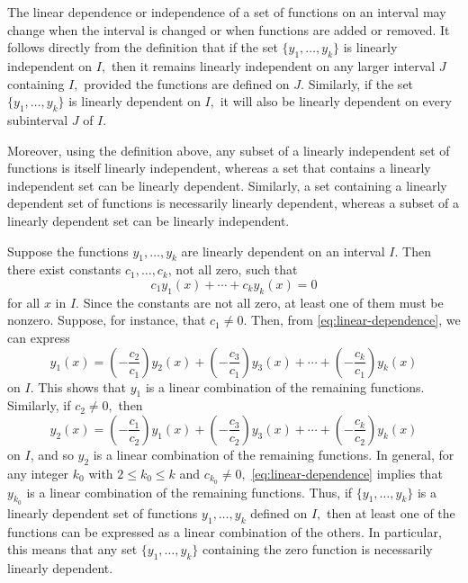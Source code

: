 The  linear dependence or independence of a set of functions on an interval may change when the interval is changed or when functions are added or removed. It follows directly from the definition that if the set \(\{y_1, \dots, y_k\}\) is linearly independent on \(I,\) then it remains linearly independent on any larger interval \(J\) containing \(I,\) provided the functions are defined on \(J.\) Similarly, if the set \(\{y_1, \dots, y_k\}\) is linearly dependent on \(I,\) it will also be linearly dependent on every subinterval \(J\) of \(I.\) 

 Moreover, using the definition above, any subset of a linearly independent set of functions is itself linearly independent, whereas  a set that contains a linearly independent set can  be linearly dependent. Similarly, a set containing a linearly dependent set of functions is necessarily linearly dependent, whereas a subset of a linearly dependent set can be linearly independent.






Suppose the functions \(y_1, \dots, y_k\) are linearly dependent on an interval \(I\). Then there exist constants \(c_1, \dots, c_k\), not all zero, such that  
\begin{equation}\label{eq:linear-dependence}
	c_1 y_1(x) + \cdots + c_k y_k(x) = 0
\end{equation}
for all \(x\) in \(I.\)
Since the constants are not all zero, at least one of them must be nonzero. Suppose, for instance, that \(c_1\ne 0.\)
Then, from \eqref{eq:linear-dependence}, we can express 
\[
y_1(x) = \left(-\frac{c_2}{c_1}\right) y_2(x) 
+ \left(-\frac{c_3}{c_1}\right) y_3(x) 
+ \cdots 
+ \left(-\frac{c_k}{c_1}\right) y_k(x)
\]
on $I$. This 
 shows that \(y_1\) is a linear combination of the remaining functions.
Similarly, if \(c_2 \ne 0,\) then  
\[
y_2(x) = \left(-\frac{c_1}{c_2}\right) y_1(x) 
+ \left(-\frac{c_3}{c_2}\right) y_3(x) 
+ \cdots 
+ \left(-\frac{c_k}{c_2}\right) y_k(x)
\]
on $I$, and 
so \(y_2\) is a linear combination of the remaining functions.
In general, for any integer \(k_0\) with \(2 \le k_0 \le k\) and \(c_{k_0} \ne 0,\) 
\eqref{eq:linear-dependence} implies that \(y_{k_0}\) is a linear combination of the remaining functions. 
Thus, if $\{y_1, \dots, y_k\}$ is a linearly dependent set of functions $y_1, \dots, y_k$ defined on $I,$ then at least one of the functions can be expressed as a linear combination of the others. In particular, this means that any set $\{y_1, \dots, y_k\}$ containing the zero function is necessarily linearly dependent.

